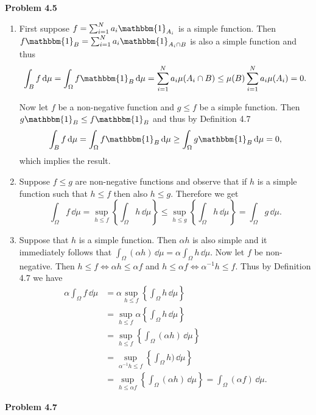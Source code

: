 \textbf{Problem 4.5}
\begin{enumerate}
\item First suppose $f = \sum_{i = 1}^N a_i \mathbbm{1}_{A_i}$ is a simple function. Then $f \mathbbm{1}_B = \sum_{i = 1}^N a_i \mathbbm{1}_{A_i \cap B}$ is also a simple function and thus
\[
	\int_B f \, \dd \mu = \int_\Omega f \mathbbm{1}_B \, \dd \mu = \sum_{i = 1}^N a_i \mu(A_i \cap B) \le \mu(B) \sum_{i = 1}^N a_i \mu(A_i) = 0.
\]

Now let $f$ be a non-negative function and $g \le f$ be a simple function. Then $g \mathbbm{1}_B \le f \mathbbm{1}_B$ and thus by Definition 4.7
\begin{align*}
	\int_B f \, \dd \mu = \int_\Omega f \mathbbm{1}_B \, \dd \mu \ge \int_\Omega g \mathbbm{1}_B \, \dd \mu = 0,
\end{align*}
which implies the result.

\item Suppose $f \le g$ are non-negative functions and observe that if $h$ is a simple function such that $h \le f$ then also $h \le g$. Therefore we get
\[
	\int_\Omega f \, \dd \mu = \sup_{h \le f}\left\{\int_\Omega h \, \dd \mu\right\}
	\le \sup_{h \le g}\left\{\int_\Omega h \, \dd \mu\right\} = \int_\Omega g \, \dd \mu.
\]
\item Suppose that $h$ is a simple function. Then $\alpha h$ is also simple and it immediately follows that $\int_\Omega (\alpha h) \, \dd \mu = \alpha \int_\Omega h \, \dd \mu$. Now let $f$ be non-negative. Then $h \le f \iff \alpha h \le \alpha f$ and $h \le \alpha f \iff \alpha^{-1} h \le f$. Thus by Definition 4.7 we have
\begin{align*}
	\alpha \int_\Omega f \, \dd \mu &= \alpha \sup_{h \le f}\left\{\int_\Omega h \, \dd \mu\right\}\\
	&= \sup_{h \le f} \alpha \left\{\int_\Omega  h \, \dd \mu\right\}\\
	&= \sup_{h \le f} \left\{\int_\Omega (\alpha h) \, \dd \mu\right\}\\
	&= \sup_{\alpha^{-1} h \le f} \left\{\int_\Omega h) \, \dd \mu\right\}\\
	&= \sup_{h \le \alpha f} \left\{\int_\Omega (\alpha h) \, \dd \mu\right\} = \int_\Omega (\alpha f) \, \dd \mu.
\end{align*}
\end{enumerate}

\bigskip

\textbf{Problem 4.7} 

